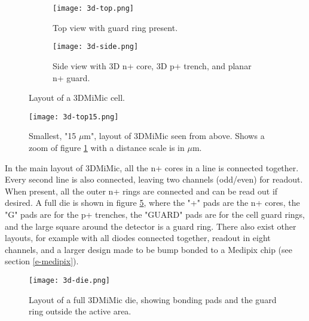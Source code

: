 \documentclass[../main/thesis.tex]{subfiles}
\begin{document}


\begin{figure}
	\centering
	\begin{subfigure}{.5\textwidth}
		\centering
		\texttt{[image: 3d-top.png]}
		\caption{Top view with guard ring present.}
		\label{fig-3dmimic-top}
	\end{subfigure}%
	\begin{subfigure}{.5\textwidth}
		\centering
		\texttt{[image: 3d-side.png]}
		\caption{Side view with 3D n+ core, 3D p+ trench, and planar n+ guard.}
		\label{fig-3dmimic-side} %
	\end{subfigure}
	\caption{Layout of a 3DMiMic cell. \citep{Marco}}
	\label{fig-3dmimic-top-side}
\end{figure}


\begin{figure}[h]
	\centering
	\texttt{[image: 3d-top15.png]}
	\caption{Smallest, "15 $\mu$m", layout of 3DMiMic seen from above. Shows a zoom of figure \ref{fig-3dmimic-top} with a distance scale is in $\mu$m. \citep{Marco}}
	\label{fig-3dmimic-top15} %
\end{figure}

In the main layout of 3DMiMic, all the n+ cores in a line is connected together. Every second line is also connected, leaving two channels (odd/even) for readout. When present, all the outer n+ rings are connected and can be read out if desired. A full die is shown in figure \ref{fig-3dmimic-die}, where the "+" pads are the n+ cores, the "G" pads are for the p+ trenches, the "GUARD" pads are for the cell guard rings, and the large square around the detector is a guard ring. There also exist other layouts, for example with all diodes connected together, readout in eight channels, and a larger design made to be bump bonded to a Medipix chip (see section \ref{e-medipix}). 

\begin{figure}%
	\centering
	\texttt{[image: 3d-die.png]}
	\caption{Layout of a full 3DMiMic die, showing bonding pads and the guard ring outside the active area. \citep{Marco}}
	\label{fig-3dmimic-die} %
\end{figure}
\end{document}
